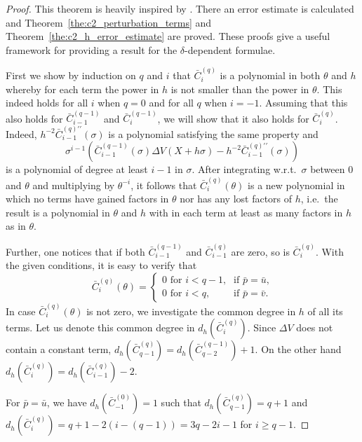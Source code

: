 \begin{proof}
    This theorem is heavily inspired by \cite{ixaru_cp_1998}. There an error estimate is calculated and Theorem~\ref{the:c2_perturbation_terms} and Theorem~\ref{the:c2_h_error_estimate} are proved. These proofs give a useful framework for providing a result for the $\delta$-dependent formulae.

    First we show by induction on $q$ and $i$ that $\bar{C}_{i}^{(q)}$ is a polynomial in both $\theta$ and $h$ whereby for each term the power in $h$ is not smaller than the power in $\theta$. This indeed holds for all $i$ when $q=0$ and for all $q$ when $i=-1$. Assuming that this also holds for $\bar{C}_{i-1}^{(q-1)}$ and $\bar{C}_{i}^{(q-1)}$, we will show that it also holds for $\bar{C}_{i}^{(q)}$. Indeed, $h^{-2}\bar{C}_{i-1}^{(q)\prime\prime}(\sigma)$ is a polynomial satisfying the same property and
    $$
        \sigma^{i-1} \left(
        \bar{C}_{i-1}^{(q-1)}(\sigma) \Delta V(X+h\sigma) - h^{-2} \bar{C}_{i-1}^{(q)\prime\prime}(\sigma)
        \right)
    $$
    is a polynomial of degree at least $i-1$ in $\sigma$. After integrating w.r.t.\ $\sigma$ between $0$ and $\theta$ and multiplying by $\theta^{-i}$, it follows that $\bar{C}_{i}^{(q)}(\theta)$ is a new polynomial in which no terms have gained factors in $\theta$ nor has any lost factors of $h$, i.e.\ the result is a polynomial in $\theta$ and $h$ with in each term at least as many factors in $h$ as in $\theta$.

    Further, one notices that if both $\bar{C}_{i-1}^{(q-1)}$ and $\bar{C}_{i-1}^{(q)}$ are zero, so is $\bar{C}_{i}^{(q)}$. With the given conditions, it is easy to verify that
    $$
        \bar{C}_{i}^{(q)}(\theta) =  \begin{cases}
            \text{$0$ for $i <q -1$,} & \text{if $\bar{p} = \bar{u}$,} \\
            \text{$0$ for $i <q$,}    & \text{if $\bar{p} = \bar{v}$.}
        \end{cases}
    $$
    In case $\bar{C}_{i}^{(q)}(\theta)$ is not zero, we investigate the common degree in $h$ of all its terms. Let us denote this common degree in $d_h(\bar{C}_{i}^{(q)})$.  Since $\Delta V$ does not contain a constant term, $d_h\left(\bar{C}_{q-1}^{(q)}\right) = d_h\left(\bar{C}_{q-2}^{(q-1)}\right)+1$.
    On the other hand $d_h\left(\bar{C}_{i}^{(q)}\right)=d_h\left(\bar{C}_{i-1}^{(q)}\right)-2$.

    For $\bar{p}=\bar{u}$, we have $d_h\left(\bar{C}_{-1}^{(0)}\right)=1$ such that $d_h\left(\bar{C}_{q-1}^{(q)}\right)=q+1$ and $d_h\left(\bar{C}_{i}^{(q)}\right) = q+1-2(i-(q-1))=3q-2i-1$ for $i \geq q-1$.


\end{proof}
